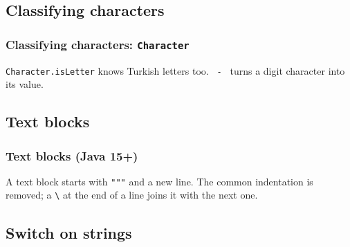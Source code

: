\documentclass[aspectratio=169,10pt,compress]{beamer}
\begin{document}
\subsection[Chars]{Classifying characters}




\begin{frame}[t,fragile] \frametitle{Classifying characters: \texttt{Character}}

  \vspace{0.3em}
  \small \texttt{Character.isLetter} knows Turkish letters too. \texttt{\textquotesingle{} - \textquotesingle} turns a digit character into its value.
\end{frame}


\subsection[Text block]{Text blocks}




\begin{frame}[t,fragile] \frametitle{Text blocks (Java 15+)}

  \vspace{0.3em}
  \small A text block starts with \texttt{"""} and a new line. The common indentation is removed;
  a \texttt{\textbackslash} at the end of a line joins it with the next one.
\end{frame}

\subsection[Switch]{Switch on strings}
\end{document}
